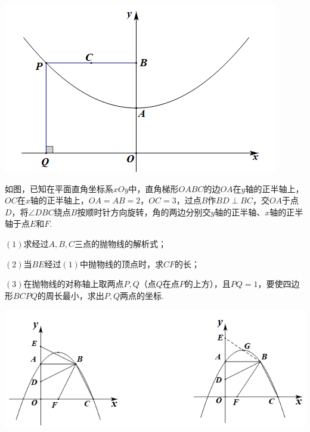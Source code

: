 \documentclass[10pt]{ctexart}
\begin{document}
\raggedleft
\includegraphics[scale=0.6]{figure/g-27.PNG} 

\begin{jply}{}{}
 如图，已知在平面直角坐标系$xOy$中，直角梯形$OABC$的边$OA$在$y$轴的正半轴上，$OC$在$x$轴的正半轴上，$OA=AB=2$，$OC=3$，过点$B$作$BD\perp BC$，交$OA$于点$D$，将$\angle DBC$绕点$B$按顺时针方向旋转，角的两边分别交$y$轴的正半轴、$x$轴的正半轴于点$E$和$F$.
 
 $(1)$求经过$A,B,C$三点的抛物线的解析式；
 
 $(2)$当$BE$经过$(1)$中抛物线的顶点时，求$CF$的长；
 
 $(3)$在抛物线的对称轴上取两点$P,Q$（点$Q$在点$P$的上方），且$PQ=1$，要使四边形$BCPQ$的周长最小，求出$P,Q$两点的坐标.
\end{jply}

\centering
\includegraphics[scale=0.6]{figure/g-28.PNG} 
\end{document}
